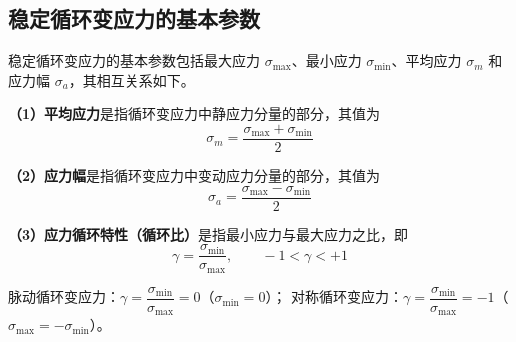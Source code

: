 \subsection{稳定循环变应力的基本参数}
\label{subsec:稳定循环变应力参数}

稳定循环变应力的基本参数包括最大应力 $\sigma_{\max}$、最小应力 $\sigma_{\min}$、平均应力 $\sigma_m$ 和应力幅 $\sigma_a$，其相互关系如下。

\textbf{（1）平均应力}是指循环变应力中静应力分量的部分，其值为
\begin{equation}
	\sigma_m = \frac{\sigma_{\max}+\sigma_{\min}}{2}
	\label{eq:强度:平均应力}
\end{equation}

\textbf{（2）应力幅}是指循环变应力中变动应力分量的部分，其值为
\begin{equation}
	\sigma_a = \frac{\sigma_{\max}-\sigma_{\min}}{2}
	\label{eq:强度:应力幅}
\end{equation}

\textbf{（3）应力循环特性（循环比）}是指最小应力与最大应力之比，即
\begin{equation}
	\gamma = \frac{\sigma_{\min}}{\sigma_{\max}}, \qquad -1 < \gamma < +1
	\label{eq:强度:循环特性}
\end{equation}

\begin{keybox}[脉动循环与对称循环]
脉动循环变应力：$\gamma=\dfrac{\sigma_{\min}}{\sigma_{\max}}=0$（$\sigma_{\min}=0$）；
对称循环变应力：$\gamma=\dfrac{\sigma_{\min}}{\sigma_{\max}}=-1$（$\sigma_{\max}=-\sigma_{\min}$）。
\end{keybox}
